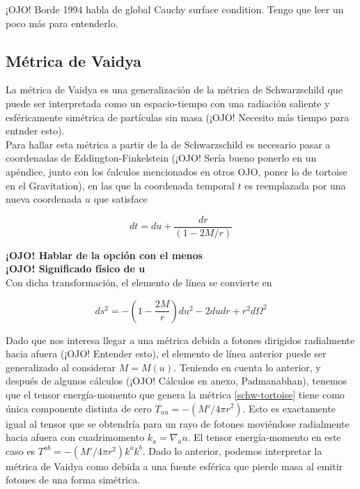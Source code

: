 \documentclass[prb,aps,preprintnumbers,amsmath,amssymb]{article}
\numberwithin{equation}{section}
\begin{document}
¡OJO! Borde 1994 habla de global Cauchy surface condition. Tengo que leer un poco más para entenderlo.


\subsection{Métrica de Vaidya}

La métrica de Vaidya \cite{vaidya} es una generalización de la métrica de Schwarzschild que puede ser interpretada como un espacio-tiempo con una radiación saliente y esféricamente simétrica de partículas sin masa (¡OJO! Necesito más tiempo para entnder esto).\\

Para hallar esta métrica a partir de la de Schwarzschild es necesario pasar a coordenadas de Eddington-Finkelstein (¡OJO! Sería bueno ponerlo en un apéndice, junto con los ćalculos mencionados en otros OJO, poner lo de tortoise en el Gravitation), en las que la coordenada temporal $t$ es reemplazada por una nueva coordenada $u$ que satisface

\begin{equation}
dt = du + \frac{dr}{(1 - 2M/r)}
\end{equation}

\textbf{¡OJO! Hablar de la opción con el menos}\\

\textbf{¡OJO! Significado físico de u}\\

Con dicha transformación, el elemento de línea se convierte en 

\begin{equation}
\label{schw-tortoise}
ds^2 = - \left(1- \frac{2M}{r}\right)du^2 - 2dudr + r^2d\Omega^2
\end{equation}

Dado que nos interesa llegar a una métrica debida a fotones dirigidos radialmente hacia afuera (¡OJO! Entender esto), el elemento de línea anterior puede ser generalizado al considerar $M = M(u)$. Teniendo en cuenta lo anterior, y después de algunos cálculos (¡OJO! Cálculos en anexo, Padmanabhan), tenemos que el tensor energía-momento que genera la métrica \eqref{schw-tortoise} tiene como única componente distinta de cero $T_{uu} = -(M'/4 \pi r^2)$. Esto es exactamente igual al tensor que se obtendría para un rayo de fotones moviéndose radialmente hacia afuera con cuadrimomento $k_{a} = \nabla_{a}u$. El tensor energía-momento en este caso es $T^{ab} = -(M'/4 \pi r^2)k^{a}k^{b}$. Dado lo anterior, podemos interpretar la métrica de Vaidya como debida a una fuente esférica que pierde masa al emitir fotones de una forma simétrica.\\
\end{document}
